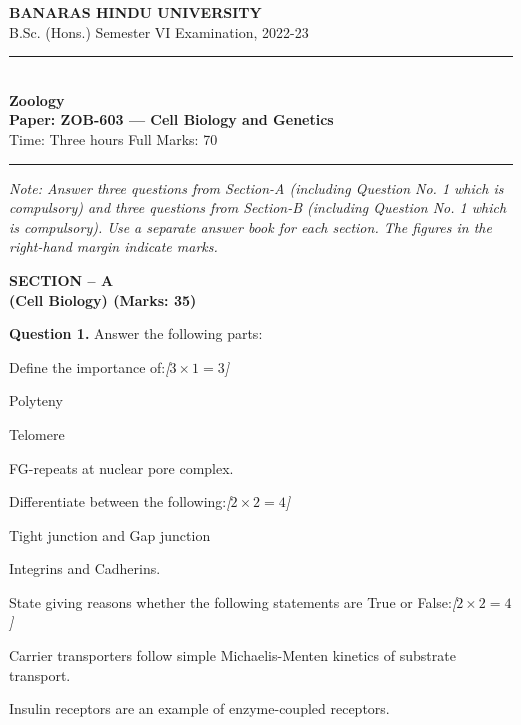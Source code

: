 \documentclass[11pt,a4paper]{article}
\newcommand{\pts}[1]{\hfill   \textit{[#1]}}
\begin{document}
\begin{center}
  {\large\bfseries BANARAS HINDU UNIVERSITY}\\[2pt]
  {\normalsize B.Sc. (Hons.) Semester VI Examination, 2022-23}\\[6pt]
  \rule{0.8\linewidth}{0.5pt}\\[6pt]
  {\large\bfseries Zoology}\\[4pt]
  {\large\bfseries Paper: ZOB-603 --- Cell Biology and Genetics}\\[4pt]
  {\normalsize Time: Three hours \hfill Full Marks: 70}
\end{center}

\rule{\linewidth}{0.4pt}

\smallskip



\noindent   \textit{Note: Answer three questions from Section-A (including Question No. 1 which is compulsory) and three questions from Section-B (including Question No. 1 which is compulsory). Use a separate answer book for each section. The figures in the right-hand margin indicate marks.}

\bigskip

\begin{center}
   \textbf{SECTION -- A} \\
   \textbf{(Cell Biology) (Marks: 35)}
\end{center}




\noindent   \textbf{Question 1.} Answer the following parts:

\begin{parts}
  \item Define the importance of:\pts{$3  \times 1 = 3$}
  
\begin{parts}
    \item Polyteny
    \item Telomere
    \item FG-repeats at nuclear pore complex.
  \end{parts}
  
  \item Differentiate between the following:\pts{$2  \times 2 = 4$}
  
\begin{parts}
    \item Tight junction and Gap junction
    \item Integrins and Cadherins.
  \end{parts}

  \item State giving reasons whether the following statements are True or False:\pts{$2  \times 2 = 4$}
  
\begin{parts}
    \item Carrier transporters follow simple Michaelis-Menten kinetics of substrate transport.
    \item Insulin receptors are an example of enzyme-coupled receptors.
  \end{parts}
\end{parts}
\end{document}
